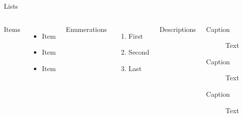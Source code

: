 \documentclass[aspectratio=169]{beamer}
\begin{document}
\begin{frame}{Lists}
  \begin{columns}[T,onlytextwidth]
      Items
      \begin{itemize}
        \item Item \item Item \item Item
      \end{itemize}

      Enumerations
      \begin{enumerate}
        \item First \item Second  \item Last
      \end{enumerate}
      Descriptions
      \begin{description}
        \item[Caption] Text 
        \item[Caption] Text
        \item[Caption] Text
      \end{description}
  \end{columns}
\end{frame}
\end{document}
